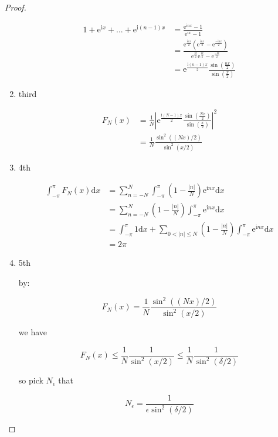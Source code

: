 \begin{proof}
\begin{enumerate}
    \begin{align*}
        1 + \mathrm{e}^{\mathrm{i}x} + ... + \mathrm{e}^{\mathrm{i}(n-1)x} &= \frac{\mathrm{e}^{\mathrm{i}nx} - 1}{\mathrm{e}^{ix} - 1} \\
        &= \frac{\mathrm{e}^{\frac{\mathrm{i}nx}{2}} \left( \mathrm{e}^{\frac{\mathrm{i}nx}{2}} - \mathrm{e}^{\frac{-\mathrm{i}nx}{2}}\right)}{\mathrm{e}^{\frac{\mathrm{i}x}{2}}\mathrm{e}^{\frac{\mathrm{i}x}{2}} - \mathrm{e}^{\frac{-\mathrm{i}x}{2}}} \\
        &= \mathrm{e}^{\frac{\mathrm{i}(n-1)x}{2}} \frac{\sin (\frac{nx}{2})}{\sin(\frac{x}{2})}
    \end{align*}

    \item third

    \begin{align*}
         F_N(x) &= \frac{1}{N}\left|\mathrm{e}^{\frac{\mathrm{i}(N-1)x}{2}} \frac{\sin (\frac{Nx}{2})}{\sin(\frac{x}{2})} \right|^2 \\
        &= \frac{1}{N} \frac{\sin^2 ((Nx)/2)}{\sin^2 (x/2)}
    \end{align*}

    \item 4th

    \begin{align*}
        \int_{-\pi}^{\pi}F_N(x) \mathrm{d}x &= \sum_{n=-N}^{N}\int_{-\pi}^{\pi}\left(1 - \frac{|n|}{N} \right) \mathrm{e}^{\mathrm{i}nx} \mathrm{d}x \\
        &= \sum_{n=-N}^{N}\left(1 - \frac{|n|}{N} \right)\int_{-\pi}^{\pi} \mathrm{e}^{\mathrm{i}nx} \mathrm{d}x\\
        &= \int_{-\pi}^{\pi} 1\mathrm{d}x + \sum_{0 < |n| \le N}\left(1 - \frac{|n|}{N} \right)\int_{-\pi}^{\pi} \mathrm{e}^{\mathrm{i}nx} \mathrm{d}x \\
        &= 2\pi
    \end{align*}

    \item 5th

    by:

    \[
        F_N(x)= \frac{1}{N} \frac{\sin^2 ((Nx)/2)}{\sin^2 (x/2)}
    \]

    we have

    \[
        F_N(x) \le \frac{1}{N} \frac{1}{\sin^2 (x/2)} \le\frac{1}{N} \frac{1}{\sin^2 (\delta/2)}
    \]

    so pick $N_{\epsilon}$ that

    \[
        N_{\epsilon} = \frac{1}{\epsilon \sin^2(\delta/2)}
    \]
    
    \end{enumerate}

\end{proof}

